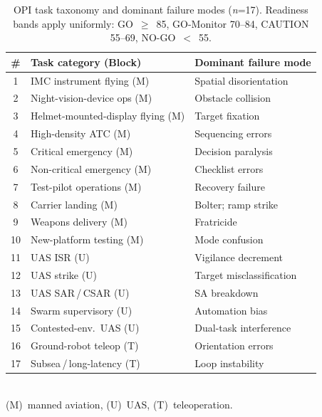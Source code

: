 \documentclass[10pt,journal,twocolumn,compsoc]{IEEEtran}
\begin{document}
\begin{table}[t]
\caption{OPI task taxonomy and dominant failure modes (\textit{n}=17). Readiness bands apply uniformly: GO~$\geq$~85, GO-Monitor 70--84, CAUTION 55--69, NO-GO~$<$~55.}
\label{tab:taxonomy}
\centering
\renewcommand{\arraystretch}{1.1}
\begin{tabularx}{\columnwidth}{@{}c X l@{}}
\toprule
\# & Task category (Block) & Dominant failure mode \\
\midrule
1  & IMC instrument flying (M)         & Spatial disorientation \\
2  & Night-vision-device ops (M)       & Obstacle collision \\
3  & Helmet-mounted-display flying (M) & Target fixation \\
4  & High-density ATC (M)              & Sequencing errors \\
5  & Critical emergency (M)            & Decision paralysis \\
6  & Non-critical emergency (M)        & Checklist errors \\
7  & Test-pilot operations (M)         & Recovery failure \\
8  & Carrier landing (M)               & Bolter; ramp strike \\
9  & Weapons delivery (M)              & Fratricide \\
10 & New-platform testing (M)          & Mode confusion \\
11 & UAS ISR (U)                       & Vigilance decrement \\
12 & UAS strike (U)                    & Target misclassification \\
13 & UAS SAR\,/\,CSAR (U)              & SA breakdown \\
14 & Swarm supervisory (U)             & Automation bias \\
15 & Contested-env.\ UAS (U)           & Dual-task interference \\
16 & Ground-robot teleop (T)           & Orientation errors \\
17 & Subsea\,/\,long-latency (T)       & Loop instability \\
\bottomrule
\end{tabularx}\\[2pt]
\footnotesize{(M)~manned aviation, (U)~UAS, (T)~teleoperation.}
\end{table}
\end{document}

